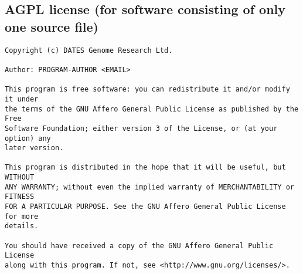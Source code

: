 \documentclass[10pt,a4paper]{article}
\begin{document}
\subsection{AGPL license (for software consisting of only one source file)}
\begin{boilerplate}
\begin{verbatim}
Copyright (c) DATES Genome Research Ltd. 

Author: PROGRAM-AUTHOR <EMAIL> 

This program is free software: you can redistribute it and/or modify it under 
the terms of the GNU Affero General Public License as published by the Free 
Software Foundation; either version 3 of the License, or (at your option) any 
later version. 

This program is distributed in the hope that it will be useful, but WITHOUT 
ANY WARRANTY; without even the implied warranty of MERCHANTABILITY or FITNESS 
FOR A PARTICULAR PURPOSE. See the GNU Affero General Public License for more 
details. 

You should have received a copy of the GNU Affero General Public License 
along with this program. If not, see <http://www.gnu.org/licenses/>. 
\end{verbatim}
\end{boilerplate}
\end{document}
